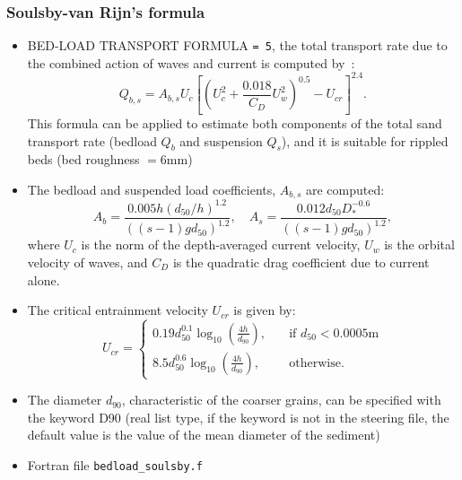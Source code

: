 \subsubsection{Soulsby-van Rijn's formula}
\begin{itemize}
\item {\ttfamily BED-LOAD TRANSPORT FORMULA} \texttt{= 5}, the total transport rate due to the combined action of waves and current is computed by~\cite{Soulsby97}:
\begin{equation*}
Q_{b,s} = A_{b,s} U_c\left[ \left( U_c^2+\frac{0.018}{C_D} U_w^2\right)^{0.5}-U_{cr}\right]^{2.4}. 
\end{equation*}
This formula can be applied to estimate both components of the total sand
transport rate (bedload $Q_b$ and suspension $Q_s$), and it is suitable for rippled beds (bed roughness $=6$mm)

\item The bedload and suspended load coefficients, $A_{b,s}$ are computed:
\begin{equation*}
A_b = \frac{0.005 h \left(d_{50}/h\right)^{1.2}}{\left((s-1)gd_{50}\right)^{1.2}}, \quad A_s = \frac{0.012 d_{50}D_*^{-0.6}}{\left((s-1)gd_{50}\right)^{1.2}},
\end{equation*}
where $U_c$ is the norm of the depth-averaged current velocity, $U_w$ is the orbital velocity of waves, and $C_D$ is the quadratic drag coefficient due to current alone.
\item The critical entrainment velocity $U_{cr}$ is given by:
\begin{equation*}
U_{cr} = \left\{\begin{array}{ll}
\displaystyle
0.19 d_{50}^{0.1}\log_{10}\left(\frac{4h}{d_{90}}\right), & \quad \text{if } d_{50} < 0.0005 \text{m} \\
\displaystyle
8.5 d_{50}^{0.6} \log_{10}\left(\frac{4h}{d_{90}} \right), & \quad \text{otherwise}.
\end{array}
\right.
\end{equation*}
\item The diameter $d_{90}$, characteristic of the coarser grains, can be specified with the keyword {\ttfamily D90} (real list type, if the keyword is not in the steering file, the default value
is the value of the mean diameter of the sediment) %
\item Fortran file \texttt{bedload\_soulsby.f}
\end{itemize}


